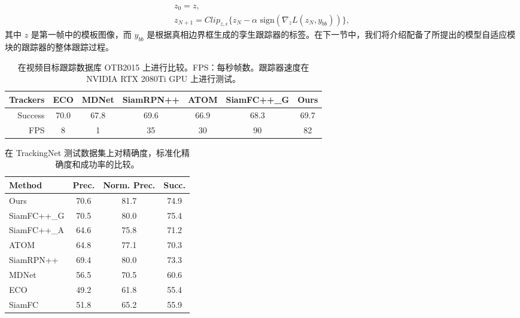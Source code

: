 \begin{equation}
    \begin{gathered}
        z_0 = z,\\
        z_{N+1} = Clip_{z,\epsilon}\{z_N -\alpha \text{ sign}(\nabla_z L(z_N,y_{bb}))\},
    \end{gathered}
    \label{equ:adaptaion}
\end{equation}
其中 $z$ 是第一帧中的模板图像，而 $y_{bb}$ 是根据真相边界框生成的孪生跟踪器的标签。在下一节中，我们将介绍配备了所提出的模型自适应模块的跟踪器的整体跟踪过程。

\begin{table}[t]
\caption{在视频目标跟踪数据库 OTB2015 上进行比较。FPS：每秒帧数。跟踪器速度在 NVIDIA RTX 2080Ti GPU 上进行测试。}
\setlength{\tabcolsep}{3pt}
\begin{center}
\begin{tabular}{r c c c c c c}
\toprule
Trackers & ECO & MDNet & SiamRPN++ & ATOM & SiamFC++\_G & Ours \\
\midrule
Success & 70.0 & 67.8  & 69.6      & 66.9      & 68.3       & 69.7 \\
FPS     & 8    & 1     & 35        & 30       & 90         & 82  \\
\bottomrule
\end{tabular}
\end{center}
\label{table:otb}
\end{table}

\begin{table}[t]
\centering
\caption{在 TrackingNet 测试数据集上对精确度，标准化精确度和成功率的比较。}
\begin{tabular}{l c c c}
\toprule
Method   &  Prec.   &  Norm. Prec. & Succ.  \\
\midrule
Ours  &  70.6&  81.7 &74.9 \\
SiamFC++\_G& 70.5 & 80.0 & 75.4 \\
SiamFC++\_A  & 64.6 & 75.8 & 71.2 \\
ATOM              & 64.8 & 77.1 & 70.3 \\
SiamRPN++&  69.4 & 80.0 &73.3 \\
MDNet	 &  56.5&  70.5 &60.6 \\
ECO	 &  49.2&  61.8 &55.4 \\
SiamFC	 &  51.8&  65.2 &55.9 \\
\bottomrule
\end{tabular}
\label{tabel:trackingnet}
\end{table}

